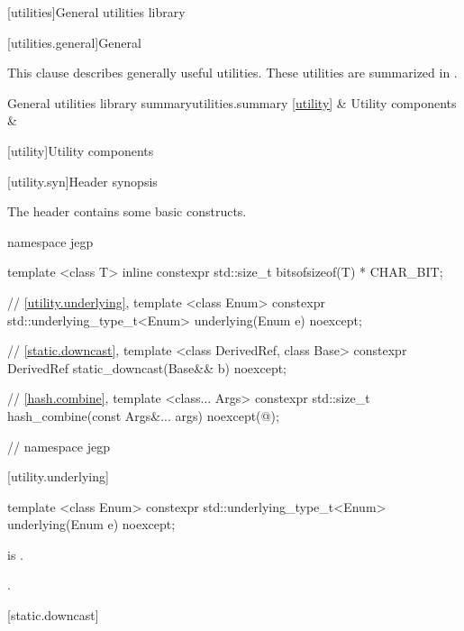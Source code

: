 [utilities]{General utilities library}

[utilities.general]{General}

\pnum
This clause describes generally useful utilities.
These utilities are summarized in .

\begin{libsumtab}{General utilities library summary}{utilities.summary}
\ref{utility}       & Utility components        &     \\
\end{libsumtab}

[utility]{Utility components}

[utility.syn]{Header  synopsis}

\pnum
The header 
contains some basic constructs.

%
%
\begin{codeblock}
namespace jegp
{
template <class T>
inline constexpr std::size_t bitsof{sizeof(T) * CHAR_BIT};

// \ref{utility.underlying}, 
template <class Enum>
constexpr std::underlying_type_t<Enum> underlying(Enum e) noexcept;

// \ref{static.downcast}, 
template <class DerivedRef, class Base>
constexpr DerivedRef static_downcast(Base&& b) noexcept;

// \ref{hash.combine}, 
template <class... Args>
constexpr std::size_t hash_combine(const Args&... args) noexcept(@\seebelow@);

} // namespace jegp
\end{codeblock}

[utility.underlying]{}

%
\begin{itemdecl}
template <class Enum>
constexpr std::underlying_type_t<Enum> underlying(Enum e) noexcept;
\end{itemdecl}

\begin{itemdescr}
\pnum
\constraints
{} is .

\pnum
\returns
{}.
\end{itemdescr}

[static.downcast]{}

